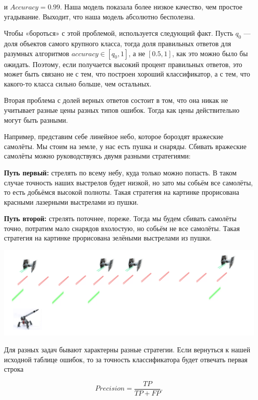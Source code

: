 \documentclass[12pt, a4paper, oneside]{article}
\begin{document}
{\begin{enumerate}
		и $Accuracy = 0.99$. Наша модель показала более низкое качество, чем простое угадывание. Выходит, что наша модель абсолютно бесполезна. 
		
		Чтобы «бороться» с этой проблемой, используется следующий факт. Пусть $q_0$ — доля объектов самого крупного класса, тогда доля правильных ответов для разумных алгоритмов $accuracy \in [q_0,1]$, а не $[0.5, 1]$, как это можно было бы ожидать. Поэтому, если получается высокий процент правильных ответов, это может быть связано не с тем, что построен хороший классификатор, а с тем, что какого-то класса сильно больше, чем остальных.
		
		Вторая проблема с долей верных ответов состоит в том, что она никак не учитывает разные цены разных типов ошибок. Тогда как цены действительно могут быть разными.
		
		Например, представим себе линейное небо, которое бороздят вражеские самолёты. Мы стоим на земле, у нас есть пушка и снаряды. Сбивать вражеские самолёты можно руководствуясь двумя разными стратегиями: 
		
		\textbf{Путь первый:}  стрелять по всему небу, куда только можно попасть. В таком случае точность наших выстрелов будет низкой, но зато мы собьём все самолёты, то есть добьёмся высокой полноты. Такая стратегия на картинке прорисована красными лазерными выстрелами из пушки.
		
		\textbf{Путь второй:} стрелять поточнее, пореже. Тогда мы будем сбивать самолёты точно, потратим мало снарядов вхолостую, но собьём не все самолёты. Такая стратегия на картинке прорисована зелёными выстрелами из пушки. 
		
		\begin{center}
			\includegraphics[width=.79\paperwidth]{fly.png}
		\end{center}
		
		
		Для разных задач бывают характерны разные стратегии. Если вернуться к нашей исходной таблице ошибок, то за точность классификатора будет отвечать первая строка
		
		\[ 
		Precision = \frac{TP}{TP + FP}.
		\]
		

\end{enumerate}}
\end{document}
